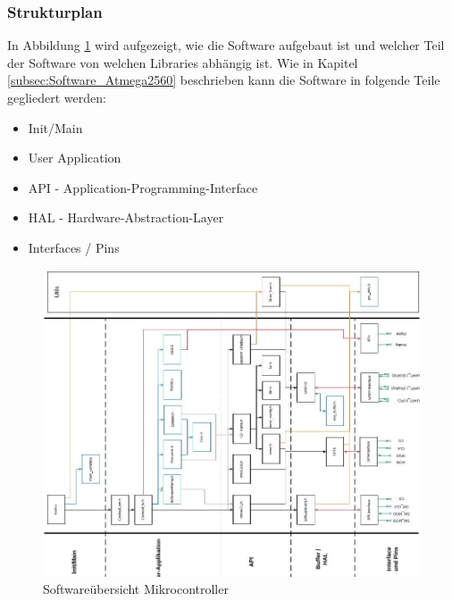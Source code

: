 
\subsubsection{Strukturplan}
\label{subsubsec:Strukturplan_Atmega}

In Abbildung \ref{fig:Softwareuebersicht_Atmega2560} wird aufgezeigt, wie die Software aufgebaut ist und welcher Teil der Software von welchen Libraries abhängig ist. Wie in Kapitel \ref{subsec:Software_Atmega2560} beschrieben kann die Software in folgende Teile gegliedert werden:
\begin{itemize}
\item Init/Main
\item User Application
\item API - Application-Programming-Interface
\item HAL - Hardware-Abstraction-Layer
\item Interfaces / Pins
\end{itemize}


\begin{figure}[H]
	\centering
	\includegraphics[angle = 270, width=\textwidth]{graphics/Softwareablauf}
	\caption{Softwareübersicht Mikrocontroller}
	\label{fig:Softwareuebersicht_Atmega2560}
\end{figure}